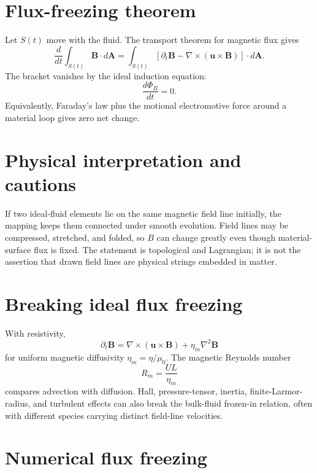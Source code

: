 \documentclass[11pt]{article}
\begin{document}
\section{Flux-freezing theorem}

Let $S(t)$ move with the fluid. The transport theorem for magnetic flux gives
\begin{equation}
\frac{d}{dt}\int_{S(t)}\mathbf B\cdot d\mathbf A
=\int_{S(t)}
\left[\partial_t\mathbf B-\nabla\times(\mathbf u\times\mathbf B)\right]\cdot d\mathbf A.
\end{equation}
The bracket vanishes by the ideal induction equation:
\begin{equation}
\boxed{\frac{d\Phi_B}{dt}=0}.
\end{equation}
Equivalently, Faraday's law plus the motional electromotive force around a material loop gives zero net change.


\section{Physical interpretation and cautions}

If two ideal-fluid elements lie on the same magnetic field line initially, the mapping keeps them connected under smooth evolution. Field lines may be compressed, stretched, and folded, so $B$ can change greatly even though material-surface flux is fixed. The statement is topological and Lagrangian; it is not the assertion that drawn field lines are physical strings embedded in matter.


\section{Breaking ideal flux freezing}

With resistivity,
\begin{equation}
\partial_t\mathbf B=\nabla\times(\mathbf u\times\mathbf B)+\eta_m\nabla^2\mathbf B
\end{equation}
for uniform magnetic diffusivity $\eta_m=\eta/\mu_0$. The magnetic Reynolds number
\begin{equation}
R_m=\frac{UL}{\eta_m}
\end{equation}
compares advection with diffusion. Hall, pressure-tensor, inertia, finite-Larmor-radius, and turbulent effects can also break the bulk-fluid frozen-in relation, often with different species carrying distinct field-line velocities.


\section{Numerical flux freezing}
\end{document}
